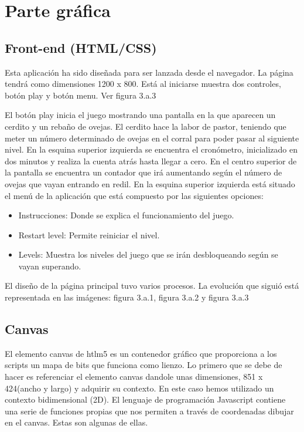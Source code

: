 \section{Parte gráfica}
\label{chap:grafica}

\subsection{Front-end (HTML/CSS)}
\label{sec:front_end}

Esta aplicación ha sido diseñada para ser lanzada desde el navegador. La página tendrá como dimensiones 1200 x 800. Está al iniciarse muestra dos controles, botón play y botón menu.
Ver figura 3.a.3

El botón play inicia el juego mostrando una pantalla en la que aparecen un cerdito y un rebaño de ovejas. El cerdito hace la labor de pastor, teniendo que meter un número determinado de ovejas en el corral para poder pasar al siguiente nivel. 
En la esquina superior izquierda se encuentra el cronómetro, inicializado en dos minutos y realiza la cuenta atrás hasta llegar a cero.
En el centro superior de la pantalla se encuentra un contador que irá aumentando según el número de ovejas que vayan entrando en redil.
En la esquina superior izquierda está situado el menú de la aplicación que está compuesto por las siguientes opciones:
\begin{itemize}
 \item Instrucciones: Donde se explica el funcionamiento del juego.
 \item Restart level: Permite reiniciar el nivel.
 \item Levels: Muestra los niveles del juego que se irán desbloqueando según se vayan superando.
\end{itemize}

El diseño de la página principal tuvo varios procesos. La evolución que siguió está representada en las imágenes: figura 3.a.1, figura 3.a.2 y figura 3.a.3 


\subsection{Canvas}
\label{sec:canvas}

El elemento canvas  de htlm5 es un contenedor gráfico que  proporciona a los scripts  un mapa de bits  que funciona como lienzo.
Lo primero que se debe de hacer es referenciar el elemento canvas dandole unas dimensiones, 851 x 424(ancho y largo) y adquirir su contexto.
En este caso hemos utilizado un contexto bidimensional (2D).
El lenguaje de programación Javascript contiene una serie de funciones propias que nos permiten  a través de coordenadas dibujar en el canvas.
Estas son algunas de ellas.

